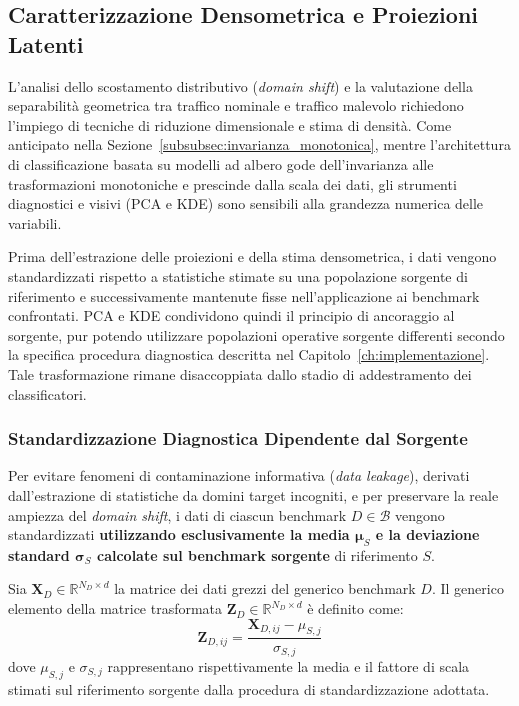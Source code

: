 \subsection{Caratterizzazione Densometrica e Proiezioni Latenti}
\label{subsec:proiezioni_densita}

L'analisi dello scostamento distributivo (\textit{domain shift}) e la valutazione della separabilità geometrica tra traffico nominale e traffico malevolo richiedono l'impiego di tecniche di riduzione dimensionale e stima di densità. Come anticipato nella Sezione~\ref{subsubsec:invarianza_monotonica}, mentre l'architettura di classificazione basata su modelli ad albero gode dell'invarianza alle trasformazioni monotoniche e prescinde dalla scala dei dati, gli strumenti diagnostici e visivi (PCA e KDE) sono sensibili alla grandezza numerica delle variabili.

Prima dell'estrazione delle proiezioni e della stima densometrica, i dati vengono standardizzati rispetto a statistiche stimate su una popolazione sorgente di riferimento e successivamente mantenute fisse nell'applicazione ai benchmark confrontati. PCA e KDE condividono quindi il principio di ancoraggio al sorgente, pur potendo utilizzare popolazioni operative sorgente differenti secondo la specifica procedura diagnostica descritta nel Capitolo~\ref{ch:implementazione}. Tale trasformazione rimane disaccoppiata dallo stadio di addestramento dei classificatori.

\subsubsection{Standardizzazione Diagnostica Dipendente dal Sorgente}
\label{subsubsec:zscore_sorgente}
Per evitare fenomeni di contaminazione informativa (\textit{data leakage}), derivati dall'estrazione di statistiche da domini target incogniti, e per preservare la reale ampiezza del \textit{domain shift}, i dati di ciascun benchmark $D \in \mathcal{B}$ vengono standardizzati \textbf{utilizzando esclusivamente la media $\boldsymbol{\mu}_S$ e la deviazione standard $\boldsymbol{\sigma}_S$ calcolate sul benchmark sorgente} di riferimento $S$.

Sia $\mathbf{X}_D \in \mathbb{R}^{N_D \times d}$ la matrice dei dati grezzi del generico benchmark $D$. Il generico elemento della matrice trasformata $\mathbf{Z}_D \in \mathbb{R}^{N_D \times d}$ è definito come:
\begin{equation}
    \mathbf{Z}_{D, ij} = \frac{\mathbf{X}_{D, ij} - \mu_{S, j}}{\sigma_{S, j}}
    \label{eq:z_score_source}
\end{equation}
dove $\mu_{S,j}$ e $\sigma_{S,j}$ rappresentano rispettivamente la media e il fattore di scala stimati sul riferimento sorgente dalla procedura di standardizzazione adottata.

